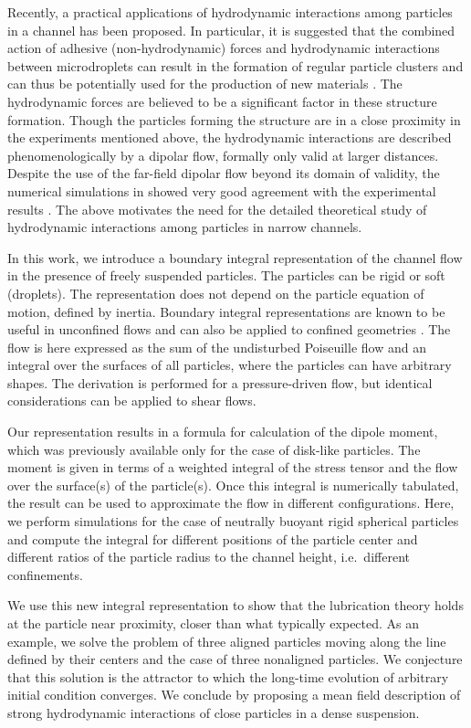 Recently, a practical applications of hydrodynamic interactions among particles in a channel has been proposed. In particular, it is suggested that the combined action of adhesive (non-hydrodynamic) forces and hydrodynamic interactions between microdroplets can result in the formation of regular particle clusters and can thus be potentially used for the production of new materials \citep{tab0,tabeling}. The hydrodynamic forces are believed to be a significant factor in these structure formation. Though the particles 
forming the structure are in a close proximity in the experiments mentioned above, the hydrodynamic interactions are described phenomenologically by a dipolar flow, formally only valid at larger distances. Despite the use of the far-field dipolar flow beyond its domain of validity, the numerical simulations  in \cite{tab0} showed very good agreement with the experimental results \citep{tabeling}. The above motivates the need for the detailed theoretical study of hydrodynamic interactions among particles in narrow channels.

In this work, we introduce a boundary integral representation of the channel flow in the presence of freely suspended particles. The particles can be rigid or soft (droplets).
The representation does not depend on the particle equation of motion, defined by inertia.
Boundary integral representations are known to be useful in unconfined flows and can also be applied to confined geometries  \citep{hb,ps}.
The flow is here expressed as the sum of the undisturbed Poiseuille flow and an integral over the surfaces of all particles, where the particles can have arbitrary shapes.
The derivation is performed for a pressure-driven flow, but identical considerations can be applied to shear flows.

Our representation results in a formula for calculation of the dipole moment, which was previously available only for the case of disk-like particles. The moment is given in terms of a weighted integral of the
stress tensor and the  flow over the surface(s) of the particle(s). Once this integral is numerically tabulated, the result can be used to approximate the flow in different configurations. Here, we perform simulations for the case of neutrally buoyant rigid spherical particles and compute the integral for different positions of the particle center and different ratios of the particle radius to the channel height, i.e.\ different confinements.

We use this new integral representation to show that the lubrication theory holds at the particle near proximity, closer than what typically expected. As an example, we solve the problem of three aligned particles moving along the line defined by their centers and  the case of three nonaligned particles.
We conjecture that this solution is the attractor to which the long-time evolution of arbitrary initial condition converges. We conclude by proposing a mean field description of strong hydrodynamic interactions of close
particles in a dense suspension.

